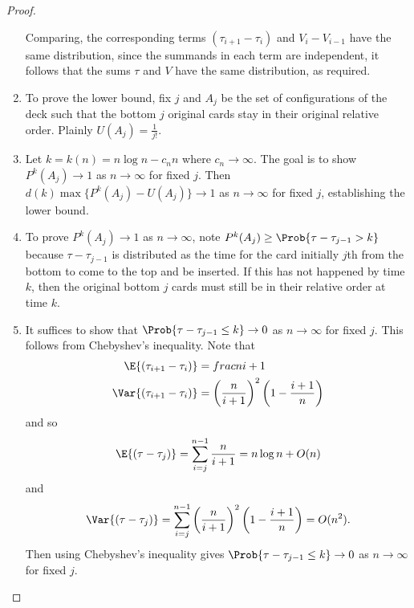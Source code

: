 \documentclass[12pt]{article}
\begin{document}
\begin{proof}
\begin{enumerate}
            Comparing, the corresponding terms \( (\tau_{i+1} - \tau_i) \)
            and \( V_i - V_{i-1} \) have the same distribution, since
            the summands in each term are independent, it follows that
            the sums \( \tau \) and \( V \) have the same distribution,
            as required.
        \item
            To prove the lower bound, fix \( j \) and \( A_j \) be the
            set of configurations of the deck such that the bottom \( j \)
            original cards stay in their original relative order.
            Plainly \( U(A_j) = \frac{1}{j!} \).
        \item
            Let \( k = k(n) = n \log n - c_n n \) where \( c_n \to
            \infty \). The goal is to show \( P^k(A_j) \to 1 \) as \( n
            \to \infty \) for fixed \( j \).  Then \( d(k) \max\{P^k(A_j)
            - U(A_j)\} \to 1 \) as \( n \to \infty \) for fixed \( j \),
            establishing the lower bound.
        \item
            To prove \( P^k(A_j) \to 1 \) as \( n \to \infty \), note \(
            P^k(A_j) \ge \Prob{\tau- \tau_{j-1} > k} \) because \( \tau
            - \tau_{j-1} \) is distributed as the time for the card
            initially \( j \)th from the bottom to come to the top and
            be inserted.  If this has not happened by time \( k \), then
            the original bottom \( j \) cards must still be in their
            relative order at time \( k \).
        \item
            It suffices to show that \( \Prob{\tau- \tau_{j-1} \le k}
            \to 0 \) as \( n \to \infty \) for fixed \( j \).  This
            follows from Chebyshev's inequality.  Note that
            \begin{align*}
                \E{(\tau_{i+1} - \tau_i)} &= frac{n}{i+1} \\
                \Var{(\tau_{i+1} - \tau_i)} &= \left( \frac{n}{i+1}
                \right)^2 \left( 1 - \frac{i+1}{n} \right)
            \end{align*}
            and so
            \[
                \E{(\tau - \tau_j)} = \sum\limits_{i=j}^{n-1} \frac{n}{i+1}
                = n \log n + O(n)
            \] and
            \[
                \Var{(\tau - \tau_j)} = \sum\limits_{i=j}^{n-1} \left(
                \frac{n}{i+1} \right)^2 \left( 1 - \frac{i+1}{n} \right)=
                O(n^2).
            \] Then using Chebyshev's inequality gives \( \Prob{\tau-
            \tau_{j-1} \le k} \to 0 \) as \( n \to \infty \) for fixed \(
            j \).
    \end{enumerate}
\end{proof}
\end{document}
